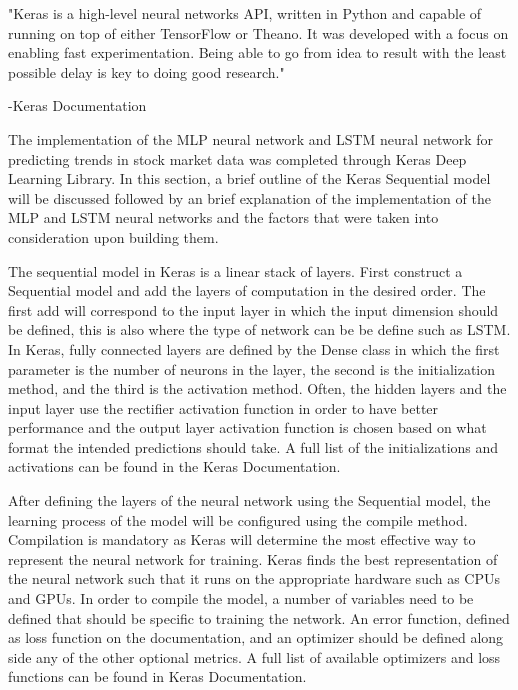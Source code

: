 "Keras is a high-level neural networks API, written in Python and capable of running on top of either TensorFlow or Theano. It was developed with a focus on enabling fast experimentation. Being able to go from idea to result with the least possible delay is key to doing good research."

-Keras Documentation \cite{chollet2015keras}

The implementation of the MLP neural network and LSTM neural network for predicting trends in stock market data was completed through Keras Deep Learning Library. In this section, a brief outline of the Keras Sequential model will be discussed followed by an brief explanation of the implementation of the MLP and LSTM neural networks and the factors that were taken into consideration upon building them. 

The sequential model in Keras is a linear stack of layers. \cite{chollet2015keras} First construct a Sequential model and add the layers of computation in the desired order. The first add will correspond to the input layer in which the input dimension should be defined, this is also where the type of network can be be define such as LSTM. In Keras, fully connected layers are defined by the Dense class in which the first parameter is the number of neurons in the layer, the second is the initialization method, and the third is the activation method. Often, the hidden layers and the input layer use the rectifier activation function in order to have better performance and the output layer activation function is chosen based on what format the intended predictions should take. A full list of the initializations and activations can be found in the Keras Documentation. \cite{2017} \cite{brownlee_2017_0}

After defining the layers of the neural network using the Sequential model, the learning process of the model will be configured using the compile method. Compilation is mandatory as Keras will determine the most effective way to represent the neural network for training. Keras finds the best representation of the neural network such that it runs on the appropriate hardware such as CPUs and GPUs. In order to compile the model, a number of variables need to be defined that should be specific to training the network. An error function, defined as loss function on the documentation, and an optimizer should be defined along side any of the other optional metrics. A full list of available optimizers and loss functions can be found in Keras Documentation. \cite{2017} \cite{brownlee_2017_0}


